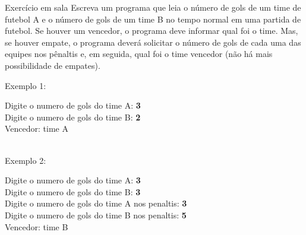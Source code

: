 \documentclass[portuguese,10pt,xcolor=table]{bredelebeamer}
\begin{document}
	\begin{frame}
	\begin{alertblock}{ Exercício em sala} 
		Escreva um programa que leia o número de gols de um time de futebol A e o número de gols de um time B no tempo normal em uma partida de futebol. Se houver um vencedor, o programa deve informar qual foi o time. Mas, se houver empate, o programa deverá solicitar o número de gols de cada uma das equipes nos pênaltis e, em seguida, qual foi o time vencedor (não há mais possibilidade de empates).

		Exemplo 1:\\
		\colorbox{gray!15}{
			\begin{varwidth}{10cm}
				Digite o numero de gols do time A: \textbf{3}\\
				Digite o numero de gols do time B: \textbf{2}\\
				Vencedor: time A
			\end{varwidth}
		}\\

		Exemplo 2:\\
		\colorbox{gray!15}{
			\begin{varwidth}{10cm}
				Digite o numero de gols do time A: \textbf{3}\\
				Digite o numero de gols do time B: \textbf{3}\\
				Digite o numero de gols do time A nos penaltis: \textbf{3}\\
				Digite o numero de gols do time B nos penaltis: \textbf{5}\\
				Vencedor: time B
			\end{varwidth}
		}\\

	\end{alertblock}
	\end{frame}
\end{document}
